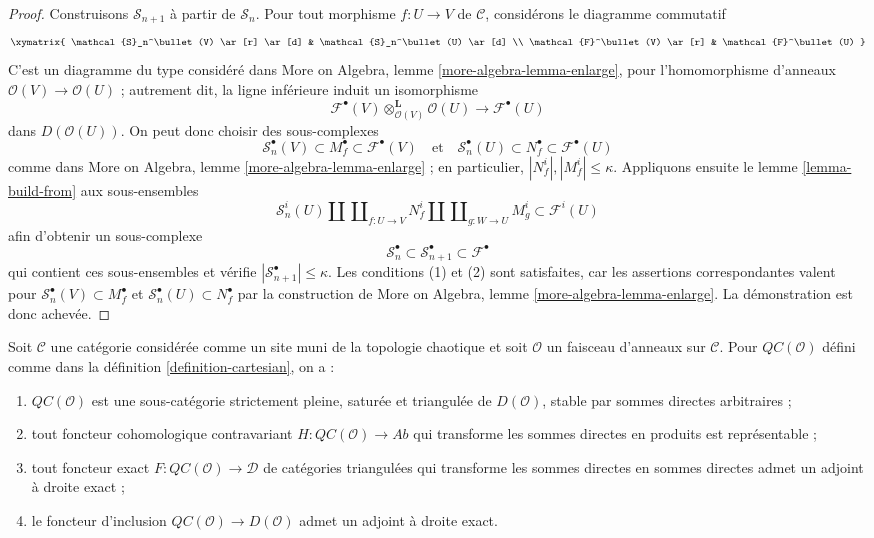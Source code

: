 \begin{proof}
\medskip\noindent
Construisons $\mathcal{S}_{n + 1}$ à partir de $\mathcal{S}_n$. Pour tout
morphisme $f : U \to V$ de $\mathcal{C}$, considérons le diagramme commutatif
$$
\xymatrix{
\mathcal{S}_n^\bullet(V)
\ar[r] \ar[d] &
\mathcal{S}_n^\bullet(U) \ar[d] \\
\mathcal{F}^\bullet(V)
\ar[r] &
\mathcal{F}^\bullet(U)
}
$$
C'est un diagramme du type considéré dans More on Algebra, lemme
\ref{more-algebra-lemma-enlarge}, pour l'homomorphisme d'anneaux
$\mathcal{O}(V) \to \mathcal{O}(U)$ ; autrement dit, la ligne inférieure
induit un isomorphisme
$$
\mathcal{F}^\bullet(V) \otimes_{\mathcal{O}(V)}^\mathbf{L} \mathcal{O}(U)
\longrightarrow
\mathcal{F}^\bullet(U)
$$
dans $D(\mathcal{O}(U))$. On peut donc choisir des sous-complexes
$$
\mathcal{S}_n^\bullet(V) \subset M^\bullet_f \subset \mathcal{F}^\bullet(V)
\quad\text{et}\quad
\mathcal{S}_n^\bullet(U) \subset N^\bullet_f \subset \mathcal{F}^\bullet(U)
$$
comme dans More on Algebra, lemme \ref{more-algebra-lemma-enlarge} ; en
particulier, $|N^i_f|, |M^i_f| \leq \kappa$. Appliquons ensuite le lemme
\ref{lemma-build-from} aux sous-ensembles
$$
\mathcal{S}_n^i(U) \amalg \coprod\nolimits_{f : U \to V} N^i_f
\amalg \coprod\nolimits_{g : W \to U} M^i_g
\subset
\mathcal{F}^i(U)
$$
afin d'obtenir un sous-complexe
$$
\mathcal{S}_n^\bullet \subset
\mathcal{S}_{n + 1}^\bullet \subset
\mathcal{F}^\bullet
$$
qui contient ces sous-ensembles et vérifie
$|\mathcal{S}_{n + 1}^\bullet| \leq \kappa$. Les conditions (1) et (2) sont
satisfaites, car les assertions correspondantes valent pour
$\mathcal{S}_n^\bullet(V) \subset M^\bullet_f$ et
$\mathcal{S}_n^\bullet(U) \subset N^\bullet_f$ par la construction de More
on Algebra, lemme \ref{more-algebra-lemma-enlarge}. La démonstration est donc
achevée.
\end{proof}

\begin{proposition}
\label{proposition-cartesian-brown}
Soit $\mathcal{C}$ une catégorie considérée comme un site muni de la
topologie chaotique et soit $\mathcal{O}$ un faisceau d'anneaux sur
$\mathcal{C}$. Pour $\mathit{QC}(\mathcal{O})$ défini comme dans la définition
\ref{definition-cartesian}, on a :
\begin{enumerate}
\item $\mathit{QC}(\mathcal{O})$ est une sous-catégorie strictement pleine,
saturée et triangulée de $D(\mathcal{O})$, stable par sommes directes
arbitraires ;
\item tout foncteur cohomologique contravariant
$H : \mathit{QC}(\mathcal{O}) \to \textit{Ab}$
qui transforme les sommes directes en produits est représentable ;
\item tout foncteur exact $F : \mathit{QC}(\mathcal{O}) \to \mathcal{D}$ de
catégories triangulées qui transforme les sommes directes en sommes directes
admet un adjoint à droite exact ;
\item le foncteur d'inclusion
$\mathit{QC}(\mathcal{O}) \to D(\mathcal{O})$ admet un adjoint à droite exact.
\end{enumerate}
\end{proposition}

